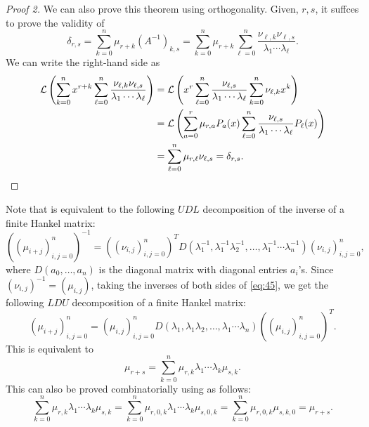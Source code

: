 \documentclass[oneside]{book}
\numberwithin{equation}{section}
\theoremstyle{definition}
\newcommand\LL{\mathcal{L}}
\begin{document}
\begin{proof}[Proof 2]
We can also prove this theorem using orthogonality.
Given, \( r,s \), it suffces to prove the validity of
\[
 \delta_{r,s} = \sum_{k=0}^{n} \mu_{r+k}(A^{-1})_{k,s}
  = \sum_{k=0}^{n} \mu_{r+k}
    \sum_{\ell=0}^{n} \frac{\nu_{\ell,k}\nu_{\ell,s}}{\lambda_1 \cdots \lambda_\ell} .
\]
We can write the right-hand side as
\begin{align*}
  \LL \left(    \sum_{k=0}^{n} x^{r+k}
  \sum_{\ell=0}^{n} \frac{\nu_{\ell,k}\nu_{\ell,s}}{\lambda_1 \cdots \lambda_\ell}
  \right)
  &= \LL \left(     x^r 
  \sum_{\ell=0}^{n}   \frac{\nu_{\ell,s}}{\lambda_1 \cdots \lambda_\ell}
    \sum_{k=0}^{n} \nu_{\ell,k} x^k \right) \\
  &= \LL \left( \sum_{a=0}^{r} \mu_{r,a}P_a(x)  
  \sum_{\ell=0}^{n} \frac{\nu_{\ell,s}}{\lambda_1 \cdots \lambda_\ell}
    P_\ell(x) \right) \\
  &= \sum_{\ell=0}^{n} \mu_{r,\ell} \nu_{\ell,s} = \delta_{r,s}. \qedhere
\end{align*}
\end{proof}

Note that  is equivalent to the following \( UDL \)
decomposition of the inverse of a finite Hankel matrix:
\begin{equation}\label{eq:45}
  \left( \left( \mu_{i+j} \right)_{i,j=0}^n \right)^{-1}
  = \left( \left( \nu_{i,j} \right)_{i,j=0}^n \right)^T
  D(\lambda_1^{-1}, \lambda_1^{-1}\lambda_2^{-1},\dots, \lambda_1^{-1} \cdots \lambda_n^{-1})
  \left( \nu_{i,j} \right)_{i,j=0}^n,
\end{equation}
where \( D(a_0,\dots,a_n) \) is the diagonal matrix with diagonal
entries \( a_i \)'s. Since \( (\nu_{i,j})^{-1} = (\mu_{i,j}) \),
taking the inverses of both sides of \eqref{eq:45}, we get
the following \( LDU \) decomposition of a finite Hankel matrix:
\begin{equation}\label{eq:46}
   \left( \mu_{i+j} \right)_{i,j=0}^n
  = \left( \mu_{i,j} \right)_{i,j=0}^n
  D(\lambda_1, \lambda_1\lambda_2,\dots, \lambda_1 \cdots \lambda_n)
  \left( \left( \mu_{i,j} \right)_{i,j=0}^n \right)^T.
\end{equation}
This is equivalent to
\[
  \mu_{r+s} = \sum_{k=0}^n \mu_{r,k} \lambda_1 \cdots \lambda_k \mu_{s,k}.
\]
This can also be proved combinatorially using  as follows:
\[
  \sum_{k=0}^n \mu_{r,k} \lambda_1 \cdots \lambda_k \mu_{s,k}
  = \sum_{k=0}^n \mu_{r,0,k} \lambda_1 \cdots \lambda_k \mu_{s,0,k} 
 = \sum_{k=0}^n \mu_{r,0,k} \mu_{s,k,0} = \mu_{r+s}.
\]
\end{document}
